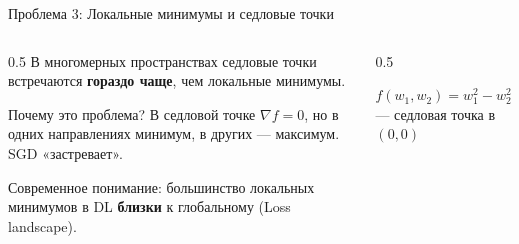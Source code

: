 \documentclass[aspectratio=169, 9pt]{beamer}
\begin{document}
\begin{frame}{Проблема 3: Локальные минимумы и седловые точки}
  \begin{columns}[T]
    \begin{column}{0.5\textwidth}
      В многомерных пространствах седловые точки встречаются \textbf{гораздо чаще}, чем локальные минимумы.
      
      \vspace{0.3em}
      \begin{block}{Почему это проблема?}
        В седловой точке $\nabla f = 0$, но в одних направлениях минимум, в других — максимум. SGD «застревает».
      \end{block}
      
      \vspace{0.3em}
      Современное понимание: большинство локальных минимумов в DL \textbf{близки} к глобальному (Loss landscape).
    \end{column}
    \begin{column}{0.5\textwidth}
      \centering
      
      \vspace{0.3em}
      $f(w_1,w_2) = w_1^2 - w_2^2$ — седловая точка в $(0,0)$
    \end{column}
  \end{columns}
\end{frame}
\end{document}
